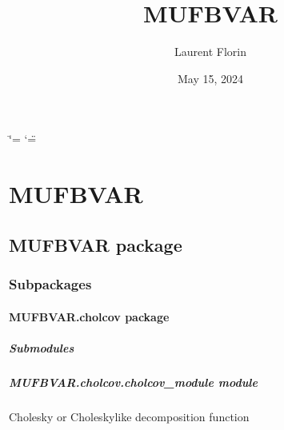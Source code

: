 \documentclass[letterpaper,10pt,english]{sphinxmanual}
\title{MUFBVAR}
\date{May 15, 2024}
\author{Laurent Florin}
\begin{document}
\ifdefined\shorthandoff
  \ifnum\catcode`\=\string=\active\shorthandoff{=}\fi
  \ifnum\catcode`\"=\active{}\fi
\fi

\pagestyle{empty}
\sphinxmaketitle
\pagestyle{plain}
\sphinxtableofcontents
\pagestyle{normal}
\label{\detokenize{index::doc}}


\sphinxstepscope


\chapter{MUFBVAR}
\label{\detokenize{modules:mufbvar}}\label{\detokenize{modules::doc}}
\sphinxstepscope


\section{MUFBVAR package}
\label{\detokenize{MUFBVAR:mufbvar-package}}\label{\detokenize{MUFBVAR::doc}}

\subsection{Subpackages}
\label{\detokenize{MUFBVAR:subpackages}}
\sphinxstepscope


\subsubsection{MUFBVAR.cholcov package}
\label{\detokenize{MUFBVAR.cholcov:mufbvar-cholcov-package}}\label{\detokenize{MUFBVAR.cholcov::doc}}

\paragraph{Submodules}
\label{\detokenize{MUFBVAR.cholcov:submodules}}

\paragraph{MUFBVAR.cholcov.cholcov\_module module}
\label{\detokenize{MUFBVAR.cholcov:module-MUFBVAR.cholcov.cholcov_module}}\label{\detokenize{MUFBVAR.cholcov:mufbvar-cholcov-cholcov-module-module}}
\sphinxAtStartPar
Cholesky or Cholesky\sphinxhyphen{}like decomposition function
\end{document}
